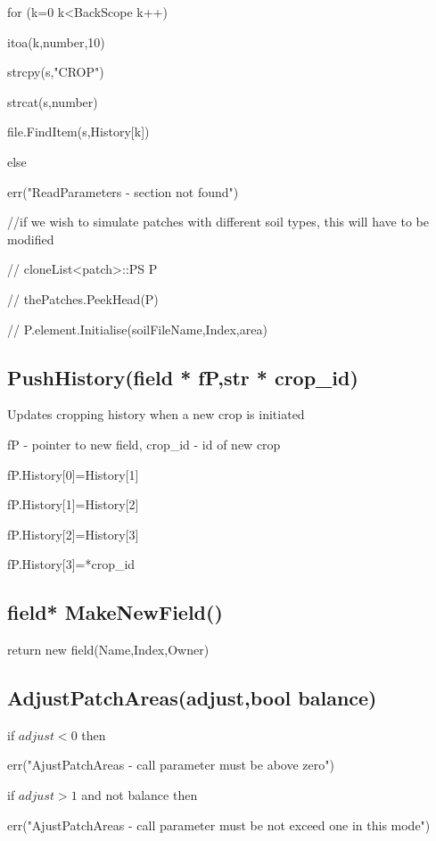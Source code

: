 \documentclass[%
]{scrartcl}
\begin{document}
       
	  \quad	for (k=0 k<BackScope k++)	
			
	  \quad	  \quad	itoa(k,number,10)
		  
	  \quad	  \quad	strcpy(s,"CROP")
		  
	  \quad	  \quad	strcat(s,number)
		  
	  \quad	  \quad	file.FindItem(s,History[k])
		

   
   
   
   
   
   else
   
     \quad   err("ReadParameters - section not found")

   //if we wish to simulate patches with different soil types, this will have to be modified
   
//   cloneList<patch>::PS P

//   thePatches.PeekHead(P)

//   P.element.Initialise(soilFileName,Index,area)



\subsection{PushHistory(field * fP,str * crop\_id)}
Updates cropping history when a new crop is initiated

   fP -  pointer to new field,
   crop\_id - id of new crop

	fP.History[0]=History[1]
	
	fP.History[1]=History[2]
	
	fP.History[2]=History[3]
	
	fP.History[3]=*crop\_id


\subsection{field* MakeNewField()}
	return new field(Name,Index,Owner)


 \subsection{AdjustPatchAreas(adjust,bool balance)}
   if $adjust <0$ then
   
   \quad   err("AjustPatchAreas - call parameter must be above zero")
   
   if $adjust>1$  and   not balance then
   
   \quad   err("AjustPatchAreas - call parameter must be not exceed one in this mode")
\end{document}
